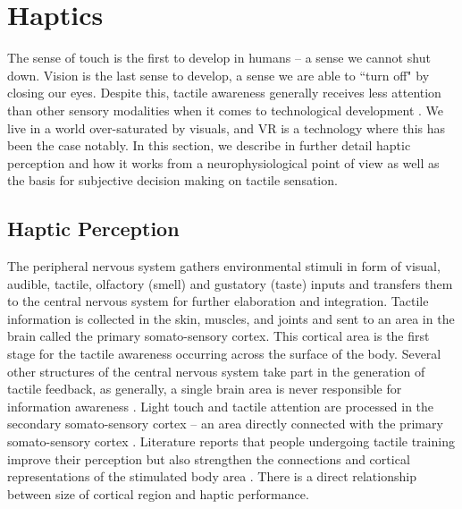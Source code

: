     \section{Haptics}\label{sec:haptics}
    The sense of touch is the first to develop in humans -- a sense we cannot shut down. Vision is the last sense to develop, a sense we are able to ``turn off" \cite{Barnett1972} by closing our eyes. Despite this, tactile awareness generally receives less attention than other sensory modalities when it comes to technological development \cite{Gallace2012}. We live in a world over-saturated by visuals, and VR is a technology where this has been the case notably. %
    In this section, we describe in further detail haptic perception and how it works from a neurophysiological point of view as well as the basis for subjective decision making on tactile sensation.
    
    \subsection{Haptic Perception}
    The peripheral nervous system gathers environmental stimuli in form of visual, audible, tactile, olfactory (smell) and gustatory (taste) inputs and transfers them to the central nervous system for further elaboration and integration. Tactile information is collected in the skin, muscles, and joints and sent to an area in the brain called the primary somato-sensory cortex\cite{Blatow2007}. This cortical area is the first stage for the tactile awareness occurring across the surface of the body. %
    Several other structures of the central nervous system take part in the generation of tactile feedback, as generally, a single brain area is never responsible for information awareness \cite{Manzoni1986}. 
    Light touch and tactile attention are processed in the secondary somato-sensory cortex -- an area directly connected with the primary somato-sensory cortex \cite{Eickhoff2005}. Literature reports that people undergoing tactile training improve their perception but also strengthen the connections and cortical representations of the stimulated body area \cite{Saito2007}. There is a direct relationship between size of cortical region and haptic performance. 
    
